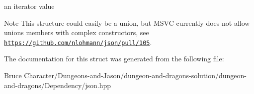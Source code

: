 an iterator value 

\begin{DoxyNote}{Note}
This structure could easily be a union, but M\+S\+VC currently does not allow unions members with complex constructors, see \href{https://github.com/nlohmann/json/pull/105}{\tt https\+://github.\+com/nlohmann/json/pull/105}. 
\end{DoxyNote}


The documentation for this struct was generated from the following file\+:\begin{DoxyCompactItemize}
\item 
Bruce Character/\+Dungeons-\/and-\/\+Jason/dungeon-\/and-\/dragons-\/solution/dungeon-\/and-\/dragons/\+Dependency/json.\+hpp\end{DoxyCompactItemize}
